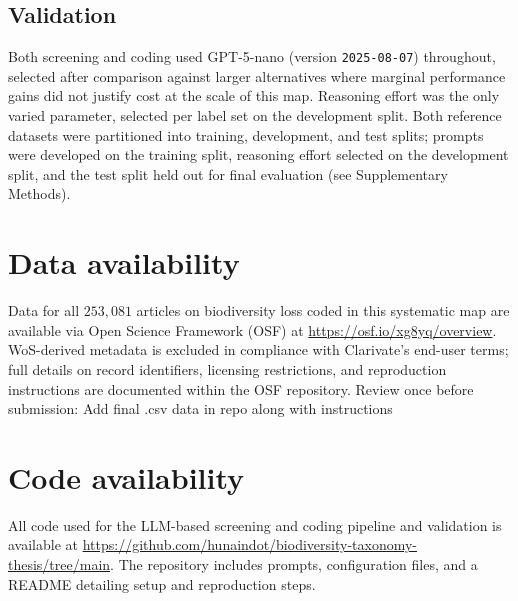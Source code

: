 \documentclass[12pt]{article}
\newcommand{\TODO}[1]{{\color{red}#1}}
\begin{document}
\subsection*{Validation}
Both screening and coding used GPT-5-nano (version \texttt{2025-08-07}) throughout, selected after comparison against larger alternatives where marginal performance gains did not justify cost at the scale of this map. Reasoning effort was the only varied parameter, selected per label set on the development split. Both reference datasets were partitioned into training, development, and test splits; prompts were developed on the training split, reasoning effort selected on the development split, and the test split held out for final evaluation (see Supplementary Methods).

\newpage
\section*{Data availability}
Data for all $253,081$ articles on biodiversity loss coded in this systematic map are available via Open Science Framework (OSF) at \url{https://osf.io/xg8yq/overview}.  WoS-derived metadata is excluded in compliance with Clarivate's end-user terms; full details on record identifiers, licensing restrictions, and reproduction instructions are documented within the OSF repository.
\TODO{Review once before submission: Add final .csv data in repo along with instructions}
\vspace{0.4cm}

\vspace{0.4cm}

\section*{Code availability}
All code used for the LLM-based screening and coding pipeline and validation is available at \url{https://github.com/hunaindot/biodiversity-taxonomy-thesis/tree/main}. The repository includes prompts, configuration files, and a README detailing setup and reproduction steps.
\end{document}

